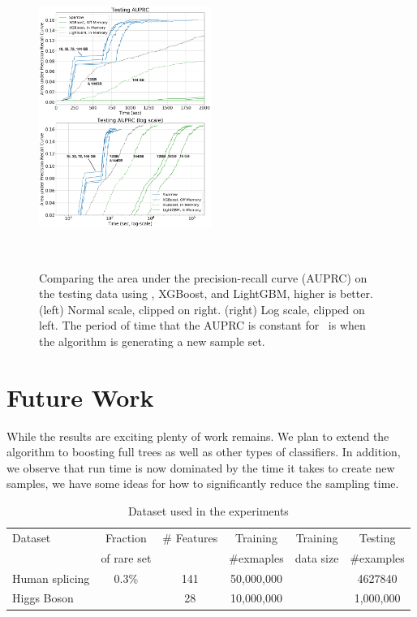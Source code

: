 \begin{figure}[t]
    \centering
    \includegraphics[width=0.5\textwidth]{figs/splice-auprc2m.png}
    \caption{Comparing the area under the precision-recall curve (AUPRC) on the testing data
    using \Sparrow, XGBoost, and LightGBM, higher is better.
    (left) Normal scale, clipped on right.
    (right) Log scale, clipped on left.
    The period of time that the AUPRC is constant for \Sparrow\ is when the algorithm is generating a new sample set.}~\label{fig:auprc}
\end{figure}


\section{Future Work}\label{sec:Conclusion}
While the results are exciting plenty of work remains. We plan to
extend the algorithm to boosting full trees as well as other types of
classifiers.
In addition, we observe that run time is now dominated by the time it
takes to create new samples, we have some ideas for how to
significantly reduce the sampling time.





\iffalse

\begin{table}[h]
\centering
\caption{Dataset used in the experiments}\label{tab:dataset}
\begin{tabular}{|l|ccccc|}
\cline{1-6}
Dataset         & Fraction    & \# Features & Training    &  Training  & Testing     \\
                & of rare set &             & \#exmaples  &  data size & \#examples  \\ \cline{1-6}
Human splicing  & 0.3\%       & 141         & 50,000,000  &            & 4627840     \\ \cline{1-6}
Higgs Boson     &             & 28          & 10,000,000  &            & 1,000,000   \\ \cline{1-6}
\end{tabular}
\end{table}

